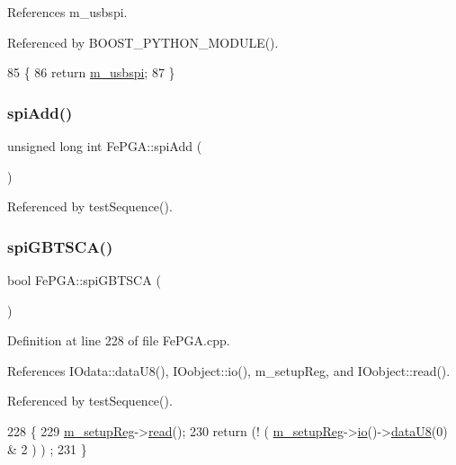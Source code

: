 References m\+\_\+usbspi.



Referenced by B\+O\+O\+S\+T\+\_\+\+P\+Y\+T\+H\+O\+N\+\_\+\+M\+O\+D\+U\+L\+E().


\begin{DoxyCode}
85                     \{
86     \textcolor{keywordflow}{return} \hyperlink{classFePGA_a922a56250b29c9842cdb8095cae8c976}{m\_usbspi};
87   \}
\end{DoxyCode}
\mbox{\label{classFePGA_a721de3fa12e207392cd6156027d2c776}} 
\subsubsection{\texorpdfstring{spi\+Add()}{spiAdd()}}
{\footnotesize\ttfamily unsigned long int Fe\+P\+G\+A\+::spi\+Add (\begin{DoxyParamCaption}{ }\end{DoxyParamCaption})}



Referenced by test\+Sequence().

\mbox{\label{classFePGA_ad305543bda4d68fe181cd7fa614b2fe1}} 
\subsubsection{\texorpdfstring{spi\+G\+B\+T\+S\+C\+A()}{spiGBTSCA()}}
{\footnotesize\ttfamily bool Fe\+P\+G\+A\+::spi\+G\+B\+T\+S\+CA (\begin{DoxyParamCaption}{ }\end{DoxyParamCaption})}



Definition at line 228 of file Fe\+P\+G\+A.\+cpp.



References I\+Odata\+::data\+U8(), I\+Oobject\+::io(), m\+\_\+setup\+Reg, and I\+Oobject\+::read().



Referenced by test\+Sequence().


\begin{DoxyCode}
228                       \{
229   \hyperlink{classFePGA_a0255fe229013986b4387c3a75ddf4e97}{m\_setupReg}->\hyperlink{classIOobject_aa07610c11963b1db6710e3c76ceea456}{read}();
230   \textcolor{keywordflow}{return} (! ( \hyperlink{classFePGA_a0255fe229013986b4387c3a75ddf4e97}{m\_setupReg}->\hyperlink{classIOobject_af04fb94137c3d86849f478ac5afab5d1}{io}()->\hyperlink{classIOdata_a75e9c318dbac3a39402179070943d4bc}{dataU8}(0) & 2 ) ) ;
231 \}
\end{DoxyCode}
\mbox{\label{classFePGA_a637b93fed75b576a54e723acb36cb6a3}} 
